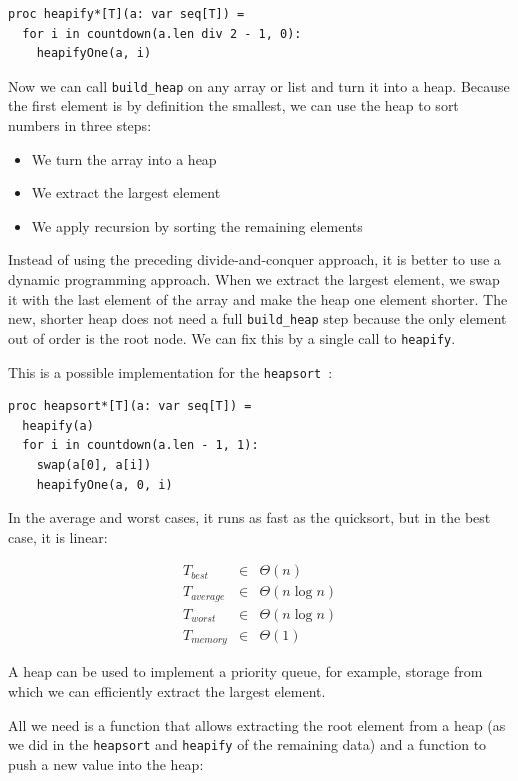 \documentclass[justified, sixbynine]{tufte-book}
\def\ft{\small\tt}
\theoremstyle{plain}%
\newtheorem * {corollary}{Corollary}
\theoremstyle{definition}
\theoremstyle{remark}
\newtheorem * {remark}{Remark}
\newtheorem * {note}{Note}
\begin{document}
\begin{fullwidth}
\begin{lstlisting}
proc heapify*[T](a: var seq[T]) =
  for i in countdown(a.len div 2 - 1, 0):
    heapifyOne(a, i)
\end{lstlisting}

Now we can call {\ft build\_heap} on any array or list and turn it into a heap.
Because the first element is by definition the smallest, we can use the heap to sort numbers in three steps:
\begin{itemize}
\item We turn the array into a heap
\item We extract the largest element
\item We apply recursion by sorting the remaining elements
\end{itemize}
Instead of using the preceding divide-and-conquer approach, it is better to use a dynamic programming approach. When we extract the largest element, we swap it with the last element of the array and make the heap one element shorter. The new, shorter heap does not need a full {\ft build\_heap} step because the only element out of order is the root node. We can fix this by a single call to {\ft heapify}.

This is a possible implementation for the {\ft heapsort}~\cite{heapsort}:

\begin{lstlisting}
proc heapsort*[T](a: var seq[T]) =
  heapify(a)
  for i in countdown(a.len - 1, 1):
    swap(a[0], a[i])
    heapifyOne(a, 0, i)
\end{lstlisting}

In the average and worst cases, it runs as fast as the quicksort, but in the best case, it is linear:

\begin{eqnarray}
T_{best} &\in &\Theta (n) \\
T_{average} &\in &\Theta (n\log n) \\
T_{worst} &\in &\Theta (n\log n) \\
T_{memory} &\in &\Theta (1)
\end{eqnarray}


A heap can be used to implement a priority queue, for example, storage from which we can efficiently extract the largest element.

All we need is a function that allows extracting the root element from a heap (as we did in the {\ft heapsort} and {\ft heapify} of the remaining data) and a function to push a new value into the heap:


\end{fullwidth}
\end{document}
